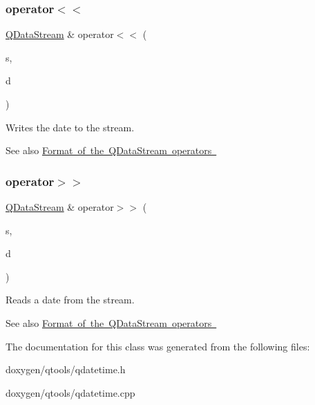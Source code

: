 \subsubsection{\texorpdfstring{operator$<$$<$}{operator<<}}
{\footnotesize\ttfamily \mbox{\hyperlink{class_q_data_stream}{Q\+Data\+Stream}} \& operator$<$$<$ (\begin{DoxyParamCaption}\item[{\mbox{\hyperlink{class_q_data_stream}{Q\+Data\+Stream}} \&}]{s,  }\item[{const \mbox{\hyperlink{class_q_date}{Q\+Date}} \&}]{d }\end{DoxyParamCaption})\hspace{0.3cm}{\ttfamily [friend]}}

Writes the date to the stream.

\begin{DoxySeeAlso}{See also}
\mbox{\hyperlink{}{Format of the Q\+Data\+Stream operators }} 
\end{DoxySeeAlso}
\mbox{\label{class_q_date_ace58c33ac3870ee3b24fb6ce8db6f269}} 
\subsubsection{\texorpdfstring{operator$>$$>$}{operator>>}}
{\footnotesize\ttfamily \mbox{\hyperlink{class_q_data_stream}{Q\+Data\+Stream}} \& operator$>$$>$ (\begin{DoxyParamCaption}\item[{\mbox{\hyperlink{class_q_data_stream}{Q\+Data\+Stream}} \&}]{s,  }\item[{\mbox{\hyperlink{class_q_date}{Q\+Date}} \&}]{d }\end{DoxyParamCaption})\hspace{0.3cm}{\ttfamily [friend]}}

Reads a date from the stream.

\begin{DoxySeeAlso}{See also}
\mbox{\hyperlink{}{Format of the Q\+Data\+Stream operators }} 
\end{DoxySeeAlso}


The documentation for this class was generated from the following files\+:\begin{DoxyCompactItemize}
\item 
doxygen/qtools/qdatetime.\+h\item 
doxygen/qtools/qdatetime.\+cpp\end{DoxyCompactItemize}
